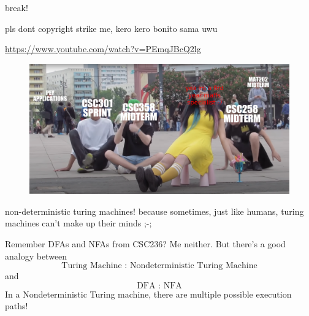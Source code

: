 \documentclass{beamer}
\begin{document}
\begin{frame}{break!}

pls dont copyright strike me, kero kero bonito sama uwu

\url{https://www.youtube.com/watch?v=PEmqJBcQ2lg}

\begin{figure}[h]
\centering
\includegraphics[width=12cm]{img/ao.png}
\end{figure}
\end{frame}

\begin{frame}{non-deterministic turing machines!}
because sometimes, just like humans, turing machines can't make up their minds ;-;

\vspace{2mm}

Remember DFAs and NFAs from CSC236? Me neither. But there's a good analogy between $$\text{Turing Machine : Nondeterministic Turing Machine}$$
and
$$\text{DFA : NFA}$$
In a Nondeterministic Turing machine, there are multiple possible execution paths!
\end{frame}
\end{document}
